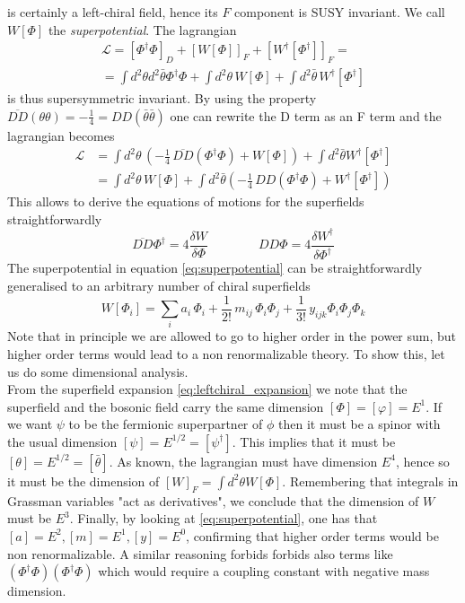 \documentclass[12pt]{article}
\begin{document}
is certainly a left-chiral field, hence its $F$ component is SUSY invariant. We call $W[\Phi]$ the \emph{superpotential}. The lagrangian
\begin{gather*}
  \mathcal{L} = \left[\Phi^\dagger\Phi\right]_D + \left[W[\Phi]\right]_F + \left[W^\dagger[\Phi^\dagger]\right]_F = \\
  = \int d^2\theta d^2\bar\theta \Phi^\dagger\Phi + \int d^2\theta \, W[\Phi] + \int d^2 \bar\theta \, W^\dagger[\Phi^\dagger] 
\end{gather*}
is thus supersymmetric invariant. By using the property $\overline{DD}(\theta\theta) = -\frac{1}{4} = DD(\bar\theta\bar\theta)$ one can rewrite the D term as an F term and the lagrangian becomes
\begin{align*}
  \mathcal{L} &= \int d^2\theta \, \left(-\frac{1}{4} \, \overline{DD}(\Phi^\dagger\Phi) + W[\Phi]\right) + \int d^2\bar\theta W^\dagger[\Phi^\dagger] \\
  &= \int d^2\theta \, W[\Phi] + \int d^2\bar\theta \left(-\frac{1}{4} \, DD(\Phi^\dagger\Phi) + W^\dagger[\Phi^\dagger]\right)
\end{align*}
This allows to derive the equations of motions for the superfields straightforwardly
\begin{equation*}
  \overline{DD} \Phi^\dagger = 4\frac{\delta W}{\delta \Phi} \qquad\qquad  DD\Phi = 4\frac{\delta W^\dagger}{\delta \Phi^\dagger}
\end{equation*}
The superpotential in equation \ref{eq:superpotential} can be straightforwardly generalised to an arbitrary number of chiral superfields \
\begin{equation*}
  W[\Phi_i] = \sum_i a_i \, \Phi_i + \frac{1}{2!} \, m_{ij} \, \Phi_i\Phi_j + \frac{1}{3!} \, y_{ijk} \Phi_i \Phi_j \Phi_k
\end{equation*}
Note that in principle we are allowed to go to higher order in the power sum, but higher order terms would lead to a non renormalizable theory. To show this, let us do some dimensional analysis. \\
From the superfield expansion \ref{eq:leftchiral_expansion} we note that the superfield and the bosonic field carry the same dimension $[\Phi] = [\varphi] = E^1$. If we want $\psi$ to be the fermionic 
superpartner of $\phi$ then it must be a spinor with the usual dimension $[\psi] = E^{1/2} = [\psi^\dagger]$. This implies that it must be $[\theta] = E^{1/2} = [\bar\theta]$. As known, the lagrangian must have dimension $E^4$, hence so  
it must be the dimension of $[W]_F = \int d^2\theta W[\Phi]$. Remembering that integrals in Grassman variables "act as derivatives", we conclude that the dimension of $W$ must be $E^3$. 
Finally, by looking at \ref{eq:superpotential}, one has that $[a] = E^2, [m] = E^1, [y] = E^0$, confirming that higher order terms would be non renormalizable. A similar reasoning forbids forbids also terms like $(\Phi^\dagger\Phi)(\Phi^\dagger\Phi)$ which would require a coupling constant with negative mass dimension. \\
\end{document}
